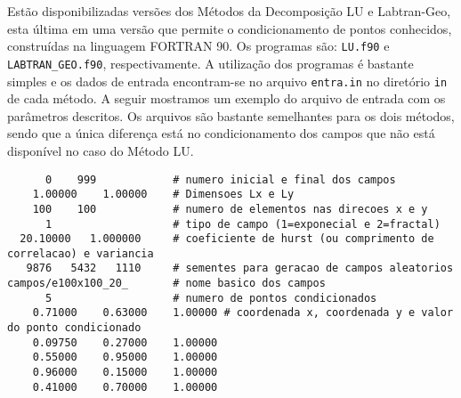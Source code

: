 \documentclass[12pt,a4paper,portuges]{article}
\begin{document}
Estão disponibilizadas versões dos Métodos da Decomposição LU e Lab\-tran-Geo, esta última em uma
versão que permite o condicionamento de pontos conhecidos, construídas na linguagem FORTRAN 90. Os
programas são: \texttt{LU.f90} e \texttt{LABTRAN\_GEO.f90}, respectivamente. A utilização dos
programas é bastante simples e os dados de entrada encontram-se no arquivo \texttt{entra.in} no
diretório \texttt{in} de cada método. A seguir mostramos um exemplo do arquivo de entrada com os
parâmetros descritos. Os arquivos são bastante semelhantes para os dois métodos, sendo que a única
diferença está no condicionamento dos campos que não está disponível no caso do Método LU.

\clearpage

\begin{verbatim}
      0    999            # numero inicial e final dos campos
    1.00000    1.00000    # Dimensoes Lx e Ly
    100    100            # numero de elementos nas direcoes x e y
      1                   # tipo de campo (1=exponecial e 2=fractal)
  20.10000   1.000000     # coeficiente de hurst (ou comprimento de correlacao) e variancia
   9876   5432   1110     # sementes para geracao de campos aleatorios
campos/e100x100_20_       # nome basico dos campos
      5                   # numero de pontos condicionados
    0.71000    0.63000    1.00000 # coordenada x, coordenada y e valor do ponto condicionado
    0.09750    0.27000    1.00000
    0.55000    0.95000    1.00000
    0.96000    0.15000    1.00000
    0.41000    0.70000    1.00000
\end{verbatim}




\end{document}

